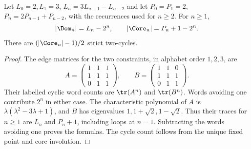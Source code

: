 \begin{corollary}\label{cor:counts}
Let $L_0=2,L_1=3$, $L_n=3L_{n-1}-L_{n-2}$ and let $P_0=P_1=2$,
$P_n=2P_{n-1}+P_{n-2}$, with the recurrences used for $n\ge2$. For $n\ge1$,
\[
 |\Dom_n|=L_n-2^n,\qquad |\Core_n|=P_n+1-2^n.
\]
There are $(|\Core_n|-1)/2$ strict two-cycles.
\end{corollary}
\begin{proof}
The edge matrices for the two constraints, in alphabet order $1,2,3$, are
\[
 A=\begin{pmatrix}1&1&1\\1&1&1\\0&1&1\end{pmatrix},\qquad
 B=\begin{pmatrix}1&1&0\\1&1&1\\0&1&1\end{pmatrix}.
\]
Their labelled cyclic word counts are $\tr(A^n)$ and $\tr(B^n)$.
Words avoiding one contribute $2^n$ in either case. The characteristic
polynomial of $A$ is $\lambda(\lambda^2-3\lambda+1)$, and $B$ has
eigenvalues $1,1+\sqrt2,1-\sqrt2$. Thus their traces for $n\ge1$ are
$L_n$ and $P_n+1$, including loops at $n=1$. Subtracting the words
avoiding one proves the formulas. The cycle count follows from the unique
fixed point and core involution.
\end{proof}
